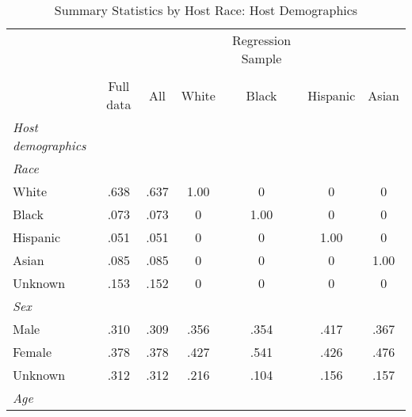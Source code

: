 {
	\begin{longtable}{l*{6}{c}}
		\caption{Summary Statistics by Host Race: Host Demographics}\\
		
		\hline
		&\multicolumn{1}{c}{}&\multicolumn{1}{c}{}&\multicolumn{1}{c}{}&\multicolumn{1}{c}{Regression Sample}&\multicolumn{1}{c}{}&\multicolumn{1}{c}{}\\
		\cline{3-7}\\
			&\multicolumn{1}{c}{Full data}&\multicolumn{1}{c}{All}&\multicolumn{1}{c}{White}&\multicolumn{1}{c}{Black}&\multicolumn{1}{c}{Hispanic}&\multicolumn{1}{c}{Asian}\\
		\hline\hline
		
		
		\textit{Host demographics} \\
		\hline 
		\textit{Race} \\
		\hspace{3mm}White     &.638 &      .637         &       1.00         &      0         &      0 	& 		0         \\
		\hspace{3mm}Black     & .073 &    .073       &       0         &      1.00         &      0 	& 		0         \\
		\hspace{3mm}Hispanic     &.051 &      .051         &       0         &      0         &      1.00 	& 		0         \\
		\hspace{3mm}Asian     & .085  &   .085      &       0         &      0         &      0 	& 		1.00         \\
		\hspace{3mm}Unknown     &.153 &      .152         &       0         &      0         &      0 	& 		0         \\
		[1em]
		\textit{Sex} \\
		\hspace{3mm}Male     & .310 &      .309         &       .356         &      .354         &      .417 	& 		.367        \\
		\hspace{3mm}Female     &.378 &      .378         &       .427        &      .541         &      .426 	& 		.476         \\
		\hspace{3mm}Unknown   & .312 &      .312         &       .216         &      .104         &      .156 	& 		.157         \\
		[1em]
		\textit{Age} \\

\end{longtable}}
